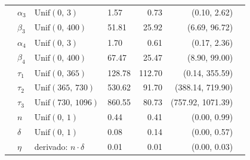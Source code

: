 \begin{longtable}{llllrrr}
 & $\alpha_{3}$ & $\text{Unif}(0,\,3)$ & 1.57 & 0.73 & (0.10, 2.62) \\
 & $\beta_{3}$ & $\text{Unif}(0,\,400)$ & 51.81 & 25.92 & (6.69, 96.72) \\
 & $\alpha_{4}$ & $\text{Unif}(0,\,3)$ & 1.70 & 0.61 & (0.17, 2.36) \\
 & $\beta_{4}$ & $\text{Unif}(0,\,400)$ & 67.47 & 25.47 & (8.90, 99.00) \\
 & $\tau_{1}$ & $\text{Unif}(0,\,365)$ & 128.78 & 112.70 & (0.14, 355.59) \\
 & $\tau_{2}$ & $\text{Unif}(365,\,730)$ & 530.62 & 91.70 & (388.14, 719.90) \\
 & $\tau_{3}$ & $\text{Unif}(730,\,1096)$ & 860.55 & 80.73 & (757.92, 1071.39) \\
 & $n$ & $\text{Unif}(0,\,1)$ & 0.44 & 0.41 & (0.00, 0.99) \\
 & $\delta$ & $\text{Unif}(0,\,1)$ & 0.08 & 0.14 & (0.00, 0.57) \\
 & $\eta$ & derivado: $n \cdot \delta$ & 0.01 & 0.01 & (0.00, 0.03) \\
\end{longtable}
